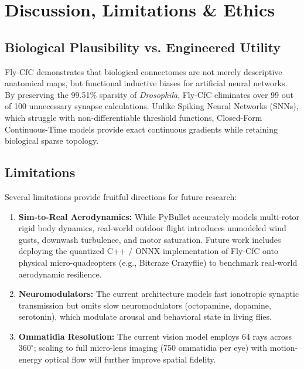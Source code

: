 \documentclass{article}
\begin{document}
\section{Discussion, Limitations \& Ethics}

\subsection{Biological Plausibility vs. Engineered Utility}
Fly-CfC demonstrates that biological connectomes are not merely descriptive anatomical maps, but functional inductive biases for artificial neural networks. By preserving the 99.51\% sparsity of \emph{Drosophila}, Fly-CfC eliminates over 99 out of 100 unnecessary synapse calculations. Unlike Spiking Neural Networks (SNNs), which struggle with non-differentiable threshold functions, Closed-Form Continuous-Time models provide exact continuous gradients while retaining biological sparse topology.

\subsection{Limitations}
Several limitations provide fruitful directions for future research:
\begin{enumerate}
    \item \textbf{Sim-to-Real Aerodynamics:} While PyBullet accurately models multi-rotor rigid body dynamics, real-world outdoor flight introduces unmodeled wind gusts, downwash turbulence, and motor saturation. Future work includes deploying the quantized C++ / ONNX implementation of Fly-CfC onto physical micro-quadcopters (e.g., Bitcraze Crazyflie) to benchmark real-world aerodynamic resilience.
    \item \textbf{Neuromodulators:} The current architecture models fast ionotropic synaptic transmission but omits slow neuromodulators (octopamine, dopamine, serotonin), which modulate arousal and behavioral state in living flies.
    \item \textbf{Ommatidia Resolution:} The current vision model employs 64 rays across $360^{\circ}$; scaling to full micro-lens imaging (750 ommatidia per eye) with motion-energy optical flow will further improve spatial fidelity.
\end{enumerate}
\end{document}
